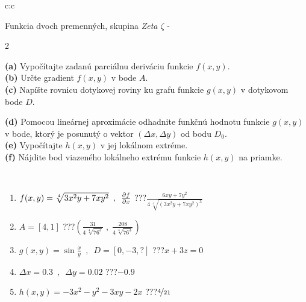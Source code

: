 \documentclass[10pt]{report}
\begin{document}
\begin{tabular}{c:c}
\begin{minipage}[c][104.5mm][t]{0.5\linewidth}
\begin{center}
\vspace{7mm}
{\huge \LARGE Funkcia dvoch premenných, skupina \textit{Zeta $\zeta$} -}\\[5mm]
\begin{minipage}{0.95\linewidth}
\begin{center}
{\small \begin{multicols}{2} \raggedright
\textbf{(a)} Vypočítajte zadanú parciálnu deriváciu funkcie \(f(x,y)\). \\[1mm]
\textbf{(b)} Určte gradient \(f(x,y)\) v bode \(A\). \\[1mm]
\textbf{(c)} Napíšte rovnicu dotykovej roviny ku grafu funkcie \(g(x,y)\) v dotykovom bode \(D\). \par \columnbreak
\textbf{(d)} Pomocou lineárnej aproximácie odhadnite funkčnú hodnotu funkcie \(g(x,y)\) v bode, ktorý je posunutý o vektor \((\Delta x, \Delta y)\) od bodu \(D_0\). \\[1mm]
\textbf{(e)} Vypočítajte \(h(x,y)\) v jej lokálnom extréme. \\[1mm]
\textbf{(f)} Nájdite bod viazeného lokálneho extrému funkcie \(h(x,y)\) na priamke. \\[1mm]
\end{multicols}
}
\end{center}
\end{minipage}
\\[4mm]
\begin{minipage}{0.79\linewidth}
\begin{center}
\begin{varwidth}{\linewidth}
\begin{enumerate}
\normalsizerr
\item $f(x,y) = \sqrt[4]{3x^2y + 7xy^2}\enspace , \enspace \pdv{f}{x}$\quad \dotfill\; ???\;\dotfill \quad $\frac{6xy+7y^2}{4\,\sqrt[4]{(3x^2y+7xy^2)^{3}}}$
\item $A = [4, 1]$\quad \dotfill\; ???\;\dotfill \quad $\left( \frac{31}{4\,\sqrt[4]{76^3}} \;,\; \frac{208}{4\,\sqrt[4]{76^3}} \right)$
\item $g(x,y) = \sin\frac{x}{y} \enspace , \enspace D = [0, -3, ?]$\quad \dotfill\; ???\;\dotfill \quad $x+3z=0$
\item $\Delta x = {0.3} \enspace,\enspace \Delta y = {0.02}$\quad \dotfill\; ???\;\dotfill \quad $-0.9$
\item $h(x,y) = -3x^2-y^2-3xy-2x$\quad \dotfill\; ???\;\dotfill \quad $\nicefrac{4}{21}$

\end{enumerate}
\end{varwidth}
\end{center}
\end{minipage}
\end{center}
\end{minipage}
\end{tabular}
\end{document}
